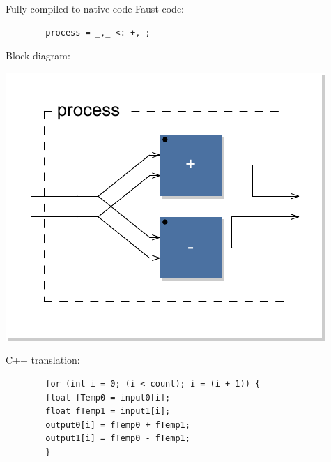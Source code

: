 \begin{frame}[fragile]{Fully compiled to native code}
    Faust code:
    \begin{lstlisting}
        process = _,_ <: +,-;
    \end{lstlisting}
    
    Block-diagram:
    \begin{center}
        \includegraphics[scale=0.4]{images/expaw}
    \end{center}
    
    C++ translation:
    \begin{lstlisting}
        for (int i = 0; (i < count); i = (i + 1)) {
        float fTemp0 = input0[i];
        float fTemp1 = input1[i];
        output0[i] = fTemp0 + fTemp1;
        output1[i] = fTemp0 - fTemp1;
        }
    \end{lstlisting}
    
\end{frame}

